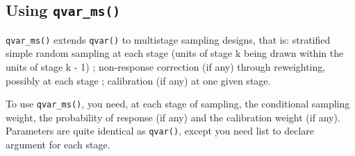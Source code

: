 \documentclass[
]{article}
\begin{document}
\subsection{\texorpdfstring{Using
\texttt{qvar\_ms()}}{Using qvar\_ms()}}\label{using-qvar_ms}

\texttt{qvar\_ms()} extends \texttt{qvar()} to multistage sampling
designs, that is: stratified simple random sampling at each stage (units
of stage k being drawn within the units of stage k - 1) ; non-response
correction (if any) through reweighting, possibly at each stage ;
calibration (if any) at one given stage.

To use \texttt{qvar\_ms()}, you need, at each stage of sampling, the
conditional sampling weight, the probability of response (if any) and
the calibration weight (if any). Parameters are quite identical as
\texttt{qvar()}, except you need list to declare argument for each
stage.
\end{document}
